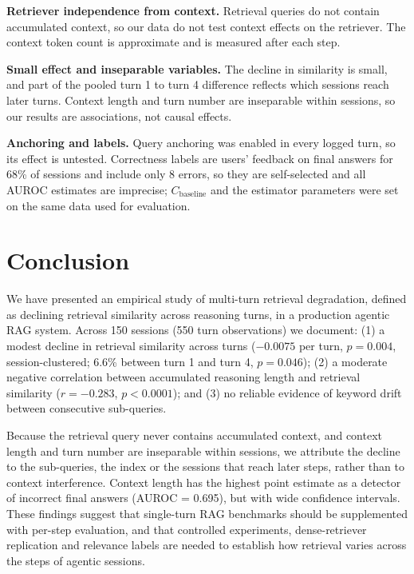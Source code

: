 \documentclass[11pt,a4paper]{article}
\begin{document}
\textbf{Retriever independence from context.} Retrieval queries do not contain accumulated context, so our data
do not test context effects on the retriever. The context token count is approximate and is measured after each
step.

\textbf{Small effect and inseparable variables.} The decline in similarity is small, and part of the pooled turn 1 to
turn 4 difference reflects which sessions reach later turns. Context length and turn number are inseparable
within sessions, so our results are associations, not causal effects.

\textbf{Anchoring and labels.} Query anchoring was enabled in every logged turn, so its effect is untested.
Correctness labels are users' feedback on final answers for 68\% of sessions and include only 8 errors, so they
are self-selected and all AUROC estimates are imprecise; $C_{\mathrm{baseline}}$ and the estimator parameters were set on
the same data used for evaluation.

\section{Conclusion}
We have presented an empirical study of multi-turn retrieval degradation, defined as declining retrieval
similarity across reasoning turns, in a production agentic RAG system. Across 150 sessions (550 turn
observations) we document: (1) a modest decline in retrieval similarity across turns ($-0.0075$ per turn,
$p = 0.004$, session-clustered; 6.6\% between turn 1 and turn 4, $p = 0.046$); (2) a moderate negative
correlation between accumulated reasoning length and retrieval similarity ($r = -0.283$, $p < 0.0001$); and (3)
no reliable evidence of keyword drift between consecutive sub-queries.

Because the retrieval query never contains accumulated context, and context length and turn number are
inseparable within sessions, we attribute the decline to the sub-queries, the index or the sessions that reach
later steps, rather than to context interference. Context length has the highest point estimate as a detector of
incorrect final answers (AUROC = 0.695), but with wide confidence intervals. These findings suggest that
single-turn RAG benchmarks should be supplemented with per-step evaluation, and that controlled experiments,
dense-retriever replication and relevance labels are needed to establish how retrieval varies across the steps of
agentic sessions.
\end{document}
